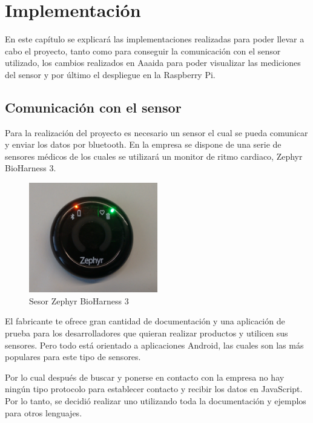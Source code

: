 \chapter{Implementación}

En este capítulo se explicará las implementaciones realizadas para poder llevar a cabo el proyecto, tanto como para conseguir la comunicación con el sensor utilizado, los cambios realizados en Aaaida para poder visualizar las mediciones del sensor y por último el despliegue en la Raspberry Pi. 

\section{Comunicación con el sensor}

Para la realización del proyecto es necesario un sensor el cual se pueda comunicar y enviar los datos por bluetooth. En la empresa se dispone de una serie de sensores médicos de los cuales se utilizará un monitor de ritmo cardiaco, Zephyr BioHarness 3. 

\begin{figure}[htb]
\begin{center}
\includegraphics[width=0.5\textwidth]{./setup/zephyr}
\caption{Sesor Zephyr BioHarness 3}
\end{center}
\end{figure}

El fabricante te ofrece gran cantidad de documentación y una aplicación de prueba para los desarrolladores que quieran realizar productos y utilicen sus sensores. Pero todo está orientado a aplicaciones Android, las cuales son las más populares para este tipo de sensores. 

Por lo cual después de buscar y ponerse en contacto con la empresa no hay ningún tipo protocolo para establecer contacto y recibir los datos en JavaScript. Por lo tanto, se decidió realizar uno utilizando toda la documentación y ejemplos para otros lenguajes. 

